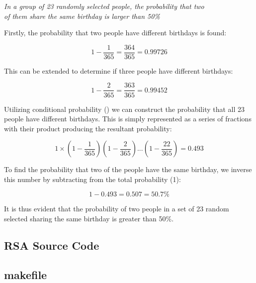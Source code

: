 \documentclass[]{article}
\begin{document}
\vspace{0.5cm}
\begin{center}
\textit{In a group of 23 randomly selected people, the probability that two\\ of them share the same birthday is larger than 50\%}
\end{center}
\vspace{0.5cm}

\noindent
Firstly, the probability that two people have different birthdays is found:

$$1-\frac{1}{365}=\frac{364}{365}=0.99726$$

\vspace{0.5cm}
\noindent
This can be extended to determine if three people have different birthdays:

$$1-\frac{2}{365}=\frac{363}{365}=0.99452$$

\vspace{0.5cm}
\noindent
Utilizing conditional probability (\cite{lecture2}) we can construct the probability that all 23 people have different birthdays. This is simply represented as a series of fractions with their product producing the resultant probability:

$$1\times(1-\frac{1}{365})(1-\frac{2}{365})...(1-\frac{22}{365})=0.493$$

\vspace{0.5cm}
\noindent
To find the probability that two of the people have the same birthday, we inverse this number by subtracting from the total probability (1):

$$1-0.493=0.507=50.7\%$$

\vspace{0.5cm}
\noindent
It is thus evident that the probability of two people in a set of 23 random selected sharing the same birthday is greater than 50\%.

\pagebreak


\vspace*{-0.8cm}
\begin{center}
	\section*{RSA Source Code}
\end{center}

\subsection*{makefile}
\pagebreak{}
\end{document}
